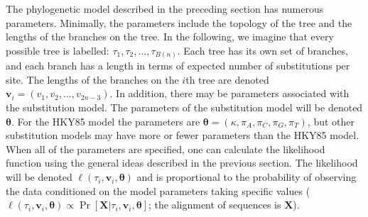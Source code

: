 \documentclass{svmult}
\begin{document}
The phylogenetic model described in the preceding section has numerous parameters. Minimally, the parameters include the
topology of the tree and the lengths of the branches on the tree. In the following, we imagine that every possible tree is labelled: 
$\tau_1, \tau_2, \ldots, \tau_{B(n)}$. Each tree has its own set of branches, and each branch has a length in terms of expected number of
substitutions per site. The lengths of the branches on the $i$th tree are denoted ${\mathbf v}_i = (v_1, v_2, \ldots, v_{2n-3})$. In addition,
there may be parameters associated with the substitution model. 
The parameters of the substitution model will be denoted ${\mathbf \theta}$. 
For the HKY85 model the parameters are ${\mathbf \theta} = (\kappa, \pi_A, \pi_C, \pi_G, \pi_T)$, but other substitution models may
have more or fewer parameters than the HKY85 model. 
When all of the parameters are specified, one can calculate the likelihood function using the general ideas described in the previous
section. The likelihood will be denoted $\ell(\tau_i, {\mathbf v}_i, {\mathbf \theta})$ and is proportional to the probability of observing the
data conditioned on the model parameters taking specific values 
($\ell(\tau_i, {\mathbf v}_i, {\mathbf \theta}) \propto \Pr[ {\mathbf X} |  \tau_i, {\mathbf v}_i, {\mathbf \theta} ] $; the alignment of
sequences is ${\mathbf X}$).
\end{document}

